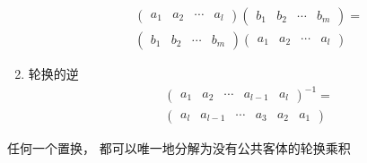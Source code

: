 \begin{note}
\begin{enumerate}
\begin{equation}
\begin{aligned}
&\begin{pmatrix}
a_1&a_2&\cdots&a_l
\end{pmatrix}
\begin{pmatrix}
b_1&b_2&\cdots&b_m
\end{pmatrix}={}\\
&\begin{pmatrix}
b_1&b_2&\cdots&b_m
\end{pmatrix}
\begin{pmatrix}
a_1&a_2&\cdots&a_l
\end{pmatrix}
\end{aligned}
\end{equation}
\item 
轮换的逆
\begin{equation}
\begin{aligned}
&\begin{pmatrix}
a_1&a_2&\cdots&a_{l-1}&a_l
\end{pmatrix}^{-1}={}\\
&\begin{pmatrix}
a_l&a_{l-1}&\cdots&a_{3}&a_2&a_1
\end{pmatrix}
\end{aligned}
\end{equation}
\end{enumerate}
\end{note}


\begin{newprop}[置换分解]
{
	\color{seco}任何一个置换，
	都可以唯一地分解为没有公共客体的轮换乘积
}
\end{newprop}


